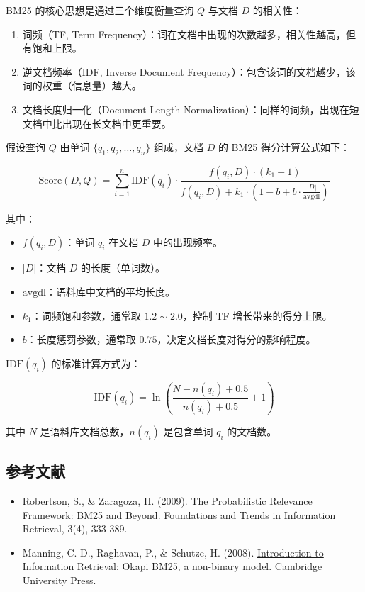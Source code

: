 BM25 的核心思想是通过三个维度衡量查询 \(Q\) 与文档 \(D\) 的相关性：

\begin{enumerate}
\def\labelenumi{\arabic{enumi}.}
\item
  词频（TF, Term Frequency）：词在文档中出现的次数越多，相关性越高，但有饱和上限。
\item
  逆文档频率（IDF, Inverse Document Frequency）：包含该词的文档越少，该词的权重（信息量）越大。
\item
  文档长度归一化（Document Length Normalization）：同样的词频，出现在短文档中比出现在长文档中更重要。
\end{enumerate}

假设查询 \(Q\) 由单词 \(\{q_1, q_2, \ldots, q_n\}\) 组成，文档 \(D\) 的 BM25 得分计算公式如下：

\[
\mathrm{Score}(D,Q)=\sum_{i=1}^{n}\mathrm{IDF}(q_i)\cdot \frac{f(q_i,D)\cdot(k_1+1)}{f(q_i,D)+k_1\cdot(1-b+b\cdot\frac{|D|}{\mathrm{avgdl}})}
\]

其中：

\begin{itemize}
\tightlist
\item
  \(f(q_i,D)\)：单词 \(q_i\) 在文档 \(D\) 中的出现频率。
\item
  \(|D|\)：文档 \(D\) 的长度（单词数）。
\item
  \(\mathrm{avgdl}\)：语料库中文档的平均长度。
\item
  \(k_1\)：词频饱和参数，通常取 \(1.2\sim2.0\)，控制 TF 增长带来的得分上限。
\item
  \(b\)：长度惩罚参数，通常取 \(0.75\)，决定文档长度对得分的影响程度。
\end{itemize}

\(\mathrm{IDF}(q_i)\) 的标准计算方式为：

\[
\mathrm{IDF}(q_i)=\ln\left(\frac{N-n(q_i)+0.5}{n(q_i)+0.5}+1\right)
\]

其中 \(N\) 是语料库文档总数，\(n(q_i)\) 是包含单词 \(q_i\) 的文档数。

\hypertarget{ux53c2ux8003ux6587ux732e-129}{%
\subsection{参考文献}\label{ux53c2ux8003ux6587ux732e-129}}

\begin{itemize}
\tightlist
\item
  Robertson, S., \& Zaragoza, H. (2009). \href{https://doi.org/10.1561/1500000019}{The Probabilistic Relevance Framework: BM25 and Beyond}. Foundations and Trends in Information Retrieval, 3(4), 333-389.
\item
  Manning, C. D., Raghavan, P., \& Schutze, H. (2008). \href{https://nlp.stanford.edu/IR-book/html/htmledition/okapi-bm25-a-non-binary-model-1.html}{Introduction to Information Retrieval: Okapi BM25, a non-binary model}. Cambridge University Press.
\end{itemize}

